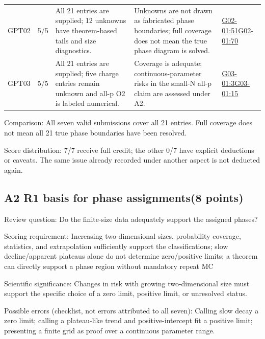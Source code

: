 \documentclass[11pt,a4paper]{article}
\begin{document}
{\begin{longtable}
{}GPT02 & 5/\allowbreak{}5 & All 21 entries are supplied; 12 unknowns have theorem-based tails and size diagnostics. & Unknowns are not drawn as fabricated phase boundaries; full coverage does not mean the true phase diagram is solved. & \hyperref[src:G02-01]{G02-01:51}\newline \hyperref[src:G02-01]{G02-01:70}\tabularnewline
{}GPT03 & 5/\allowbreak{}5 & All 21 entries are supplied; five charge entries remain unknown and all-p O2 is labeled numerical. & Coverage is adequate; continuous-parameter risks in the small-N all-p claim are assessed under A2. & \hyperref[src:G03-01]{G03-01:3}\newline \hyperref[src:G03-01]{G03-01:15}\tabularnewline
\bottomrule
\end{longtable}
}
Comparison: All seven valid submissions cover all 21 entries. Full coverage does not mean all 21 true phase boundaries have been resolved.

Score distribution: 7/\allowbreak{}7 receive full credit; the other 0/\allowbreak{}7 have explicit deductions or caveats. The same issue already recorded under another aspect is not deducted again.

\clearpage
\subsection{A2 R1 basis for phase assignments(8 points)}
\label{aspect:A2}
Review question: Do the finite-size data adequately support the assigned phases?

Scoring requirement: Increasing two-dimensional sizes,\allowbreak{} probability coverage,\allowbreak{} statistics,\allowbreak{} and extrapolation sufficiently support the classifications; slow decline/\allowbreak{}apparent plateaus alone do not determine zero/\allowbreak{}positive limits; a theorem can directly support a phase region without mandatory repeat MC

Scientific significance: Changes in risk with growing two-dimensional size must support the specific choice of a zero limit,\allowbreak{} positive limit,\allowbreak{} or unresolved status.

Possible errors (checklist,\allowbreak{} not errors attributed to all seven): Calling slow decay a zero limit; calling a plateau-like trend and positive-intercept fit a positive limit; presenting a finite grid as proof over a continuous parameter range.
\end{document}
